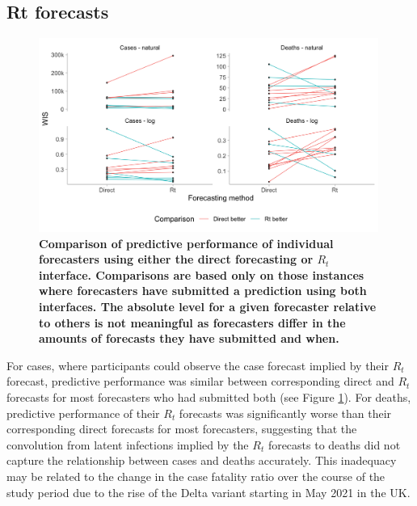 \documentclass[10pt,a4paper,twocolumn]{article}
\begin{document}
\subsection*{Rt forecasts}

\begin{figure}
\centering
\includegraphics[width=0.99\textwidth]{../output/figures/comparison-direct-rt-individual.png}
\caption{\bf{Comparison of predictive performance of individual forecasters using either the direct forecasting or $R_t$ interface}. Comparisons are based only on those instances where forecasters have submitted a prediction using both interfaces. The absolute level for a given forecaster relative to others is not meaningful as forecasters differ in the amounts of forecasts they have submitted and when.}
\label{fig:comparison-direct-rt-individual}
\end{figure}

For cases, where participants could observe the case forecast implied by their $R_t$ forecast, predictive performance was similar between corresponding direct and $R_t$ forecasts for most forecasters who had submitted both (see Figure \ref{fig:comparison-direct-rt-individual}). For deaths, predictive performance of their $R_t$ forecasts was significantly worse than their corresponding direct forecasts for most forecasters, suggesting that the convolution from latent infections implied by the $R_t$ forecasts to deaths did not capture the relationship between cases and deaths accurately. This inadequacy may be related to the change in the case fatality ratio over the course of the study period due to the rise of the Delta variant starting in May 2021 in the UK.  

\end{document}
